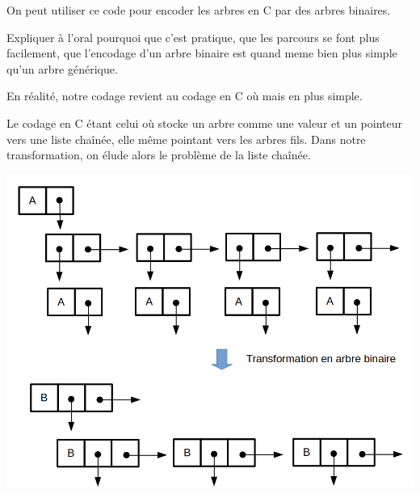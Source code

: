 	\begin{appl}
		On peut utiliser ce code pour encoder les arbres en C par des arbres binaires.
		\begin{com}
			Expliquer à l'oral pourquoi que c'est pratique, que les parcours se font plus facilement, que l'encodage d'un arbre binaire est quand meme bien plus simple qu'un arbre générique.
		\end{com}
		En réalité, notre codage revient au codage en C où mais en plus simple.
		\begin{com}
			Le codage en C étant celui où stocke un arbre comme une valeur et un pointeur vers une liste chaînée, elle même pointant vers les arbres fils. Dans notre transformation, on élude alors le problème de la liste chaînée.
		\end{com}
		\begin{center}
			\includegraphics[scale=0.4]{Developpements/Correspondance arbres binaires et généraux/arbre_en_c.png}
		\end{center}
	\end{appl}